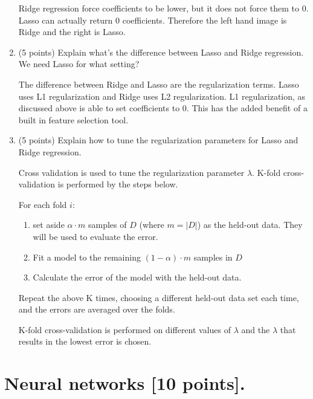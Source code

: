 \documentclass[a4paper,12pt,fleqn]{article}
\begin{document}
\begin{enumerate}
\vspace{0.15in}
Ridge regression force coefficients to be lower, but it does not force them to 0.  Lasso can actually return 0 coefficients.  Therefore the left hand image is Ridge and the right is Lasso.

\vspace{0.15in}
\item (5 points) Explain what's the difference between Lasso and Ridge regression. We need Lasso for what setting?

\vspace{0.15in}
The difference between Ridge and Lasso are the regularization terms.  Lasso uses L1 regularization and Ridge uses L2 regularization.  L1 regularization, as discussed above is able to set coefficients to 0.  This has the added benefit of a built in feature selection tool.  


\vspace{0.15in}

\item (5 points) Explain how to tune the regularization parameters for Lasso and Ridge regression. 

\vspace{.15in}
Cross validation is used to tune the regularization parameter $\lambda$.  K-fold cross-validation is performed by the steps below.


For each fold $i$:
\begin{enumerate}[label=\arabic*)]
\item set aside $\alpha \cdot m$ samples of $D$ (where $m = |D|$) as the held-out data.  They will be used to evaluate the error.
\item Fit a model to the remaining $(1-\alpha)\cdot m$ samples in $D$
\item Calculate the error of the model with the held-out data.
\end{enumerate}
\vspace{.15in}

Repeat the above K times, choosing a different held-out data set each time, and the errors are averaged over the folds.  

K-fold cross-validation is performed on different values of $\lambda$ and the $\lambda$ that results in the lowest error is chosen.
 

\end{enumerate}


\clearpage

\section{Neural networks [10 points].}
\end{document}
